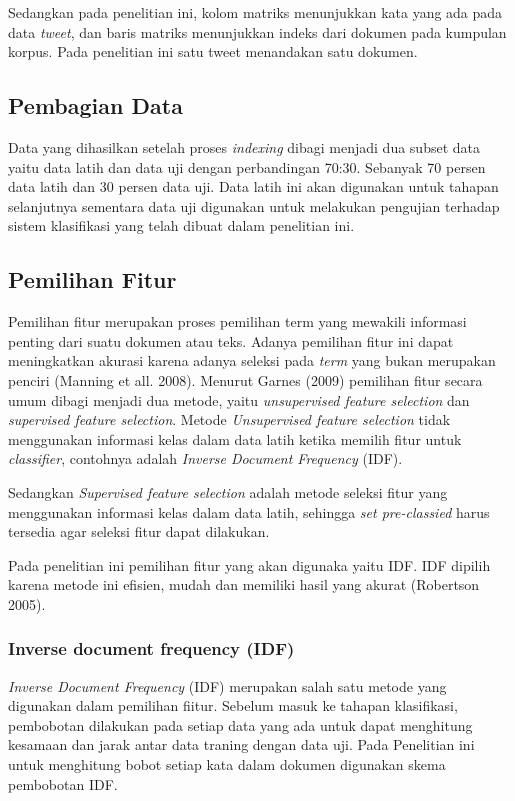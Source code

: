 Sedangkan pada penelitian ini, kolom matriks menunjukkan kata yang ada pada data \textit{tweet}, dan baris matriks menunjukkan indeks dari dokumen pada kumpulan korpus. Pada penelitian ini satu tweet menandakan satu dokumen.

\subsection*{Pembagian Data}

Data yang dihasilkan setelah proses \textit{indexing} dibagi  menjadi  dua subset data yaitu data latih dan data uji dengan perbandingan 70:30. Sebanyak 70 persen data latih dan 30 persen data uji. Data latih ini akan digunakan untuk tahapan selanjutnya sementara data uji digunakan untuk melakukan pengujian terhadap sistem klasifikasi yang telah dibuat dalam penelitian ini.

\subsection*{Pemilihan Fitur}

Pemilihan fitur merupakan proses pemilihan term yang mewakili informasi penting dari suatu dokumen atau teks. Adanya pemilihan fitur ini dapat meningkatkan akurasi karena adanya seleksi pada \textit{term} yang bukan merupakan penciri (Manning et all. 2008). Menurut Garnes (2009) pemilihan fitur secara umum dibagi menjadi dua metode, yaitu \textit{unsupervised feature selection} dan \textit{supervised feature selection}. Metode \textit{Unsupervised feature selection} tidak menggunakan informasi kelas dalam data latih ketika memilih fitur untuk \textit{classifier}, contohnya adalah \textit{Inverse Document Frequency} (IDF). 

Sedangkan \textit{Supervised feature selection}  adalah metode seleksi fitur yang menggunakan informasi kelas dalam data latih, sehingga \textit{set pre-classied} harus tersedia agar seleksi fitur dapat dilakukan. 

Pada penelitian ini pemilihan fitur yang akan digunaka yaitu IDF. IDF dipilih karena metode ini efisien, mudah dan memiliki hasil yang akurat (Robertson 2005).


\subsubsection*{Inverse document frequency (IDF)}

\textit{Inverse Document Frequency} (IDF) merupakan salah satu metode yang digunakan dalam pemilihan fiitur.  Sebelum masuk ke tahapan klasifikasi, pembobotan dilakukan pada setiap data yang ada untuk dapat menghitung kesamaan dan jarak antar data traning dengan data uji. Pada Penelitian ini untuk menghitung bobot setiap kata dalam dokumen digunakan skema pembobotan IDF.
 
